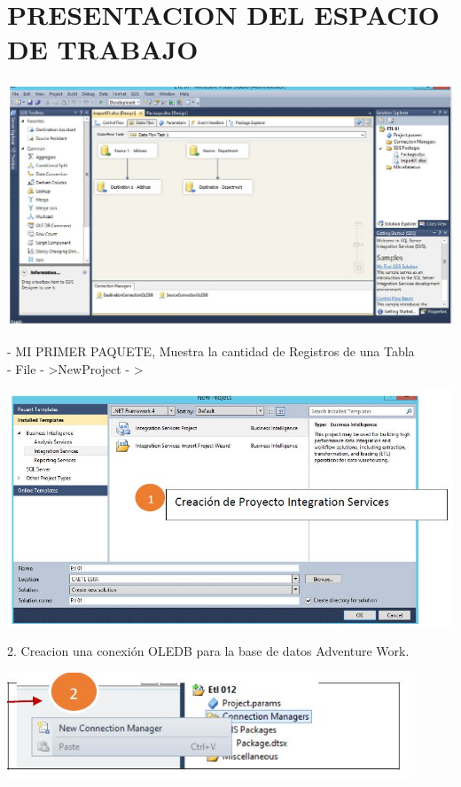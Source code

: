 \section{PRESENTACION DEL ESPACIO DE TRABAJO} 

	\begin{center}
	\includegraphics[width=15cm]{./Imagenes/10}
	\end{center}	

- MI PRIMER PAQUETE, Muestra la cantidad de Registros de una Tabla\\
- File - \textgreater NewProject - \textgreater

	\begin{center}
	\includegraphics[width=15cm]{./Imagenes/11}
	\end{center}	

2. Creacion una conexión OLEDB para la base de datos Adventure Work.

	\begin{center}
	\includegraphics[width=12cm]{./Imagenes/111}
	\end{center}	

